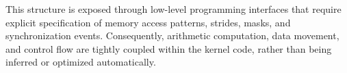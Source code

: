 This structure is exposed through low-level programming interfaces that require explicit specification of memory access patterns, strides, masks, and synchronization events. Consequently, arithmetic computation, data movement, and control flow are tightly coupled within the kernel code, rather than being inferred or optimized automatically.

